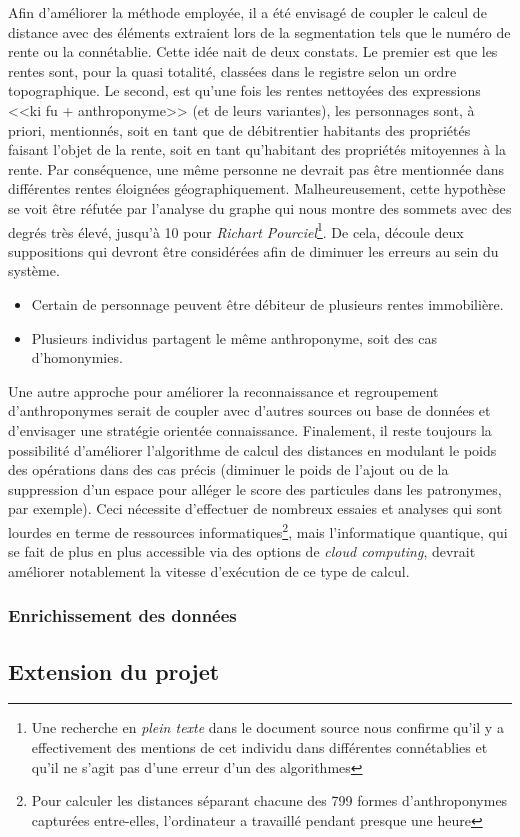 Afin d'améliorer la méthode employée, il a été envisagé de coupler le calcul de distance avec des éléments extraient lors de la segmentation tels que le numéro de rente ou la connétablie. Cette idée nait  de deux constats.
Le premier est que les rentes sont, pour la quasi totalité, classées dans le registre selon un ordre topographique. Le second, est qu'une fois les rentes nettoyées des expressions <<ki fu + anthroponyme>> (et de leurs variantes), les personnages sont, à priori, mentionnés, soit en tant que de débitrentier habitants des propriétés faisant l'objet de la rente, soit en tant qu'habitant des propriétés mitoyennes à la rente. Par conséquence, une même personne ne devrait pas être mentionnée dans différentes rentes éloignées géographiquement. 
Malheureusement, cette hypothèse se voit être réfutée par l'analyse du graphe  qui nous montre des sommets avec des degrés très élevé, jusqu'à 10 pour \textit{Richart Pourciel}\footnote{Une recherche en \textit{plein texte} dans le document source nous confirme qu'il y a effectivement des mentions de cet individu dans différentes connétablies et qu'il ne s'agit pas d'une erreur d'un des algorithmes}.
De cela, découle deux suppositions qui devront être considérées afin de diminuer les erreurs au sein du système. 
\begin{itemize}
    \item Certain de personnage peuvent être débiteur de plusieurs rentes immobilière. 
    \item Plusieurs individus partagent le même anthroponyme, soit des cas d'homonymies.
\end{itemize}

Une autre approche pour améliorer la reconnaissance et regroupement d'anthroponymes serait de coupler avec d'autres sources ou base de données et d'envisager une stratégie orientée connaissance.
Finalement, il reste toujours la possibilité d'améliorer l'algorithme de calcul des distances en modulant le poids des opérations dans des cas précis (diminuer le poids de l'ajout ou de la suppression d'un espace pour alléger le score des particules dans les patronymes, par exemple). Ceci nécessite d'effectuer de nombreux essaies et analyses qui sont lourdes en terme de ressources informatiques\footnote{Pour calculer les distances séparant chacune des 799 formes d'anthroponymes capturées entre-elles, l'ordinateur a travaillé pendant presque une heure}, mais l'informatique quantique, qui se fait de plus en plus accessible via des options de \textit{cloud computing}, devrait améliorer notablement la vitesse d'exécution de ce type de calcul. 

\subsubsection{Enrichissement des  données}
\subsection{Extension du projet}

